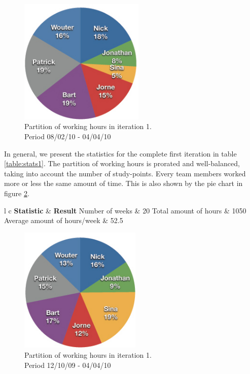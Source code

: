 \documentclass[salesmen, twoside]{../../../templates/latex/2009/softproj}
\begin{document}
\begin{projdoc}
			\begin{figure}
				\begin{center}
				\includegraphics[height=6cm]{../../img/partition-1iter-2sem.jpg}
				\caption{Partition of working hours in iteration 1.\\ Period 08/02/10 - 04/04/10}
				\label{fig:stats1-2}
				\end{center}
			\end{figure}
			
			In general, we present the statistics for the complete first iteration in table \ref{table:stats1}. The 
			partition of working hours is prorated and well-balanced, taking into account the number of study-points. Every 
			team members worked more or less the same amount of time. This is 
			also shown by the pie chart
			in figure \ref{fig:stats1-3}.
			 
			\begin{table}
				\begin{center}
			\begin{tabular}{l c}
				\FL \textbf{Statistic} & \textbf{Result}
				\ML Number of weeks & 20
				\NN Total amount of hours  & 1050
				\NN Average amount of hours/week & 52.5
			\end{tabular}
			\caption{General statistics for iteration 1.}
			\label{table:stats1}
			\end{center}
			\end{table}
			
			\begin{figure}
				\begin{center}
				\includegraphics[height=6cm]{../../img/partition-1iter-total.jpg}
				\caption{Partition of working hours in iteration 1. \\ Period 12/10/09 - 04/04/10}
				\label{fig:stats1-3}
				\end{center}
			\end{figure}
			

\end{projdoc}
\end{document}
